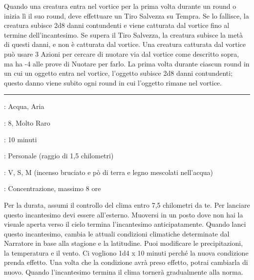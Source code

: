 \begin{multicols}{2}
Quando una creatura entra nel vortice per la prima volta durante un round o inizia lì il suo round, deve effettuare un Tiro Salvezza su Tempra. Se lo fallisce, la creatura subisce 2d8 danni contundenti e viene catturata dal vortice fino al termine dell'incantesimo. Se supera il Tiro Salvezza, la creatura subisce la metà di questi danni, e non è catturata dal vortice. Una creatura catturata dal vortice può usare 3 Azioni per cercare di nuotare via dal vortice come descritto sopra, ma ha -4 alle prove di Nuotare per farlo. La prima volta durante ciascun round in un cui un oggetto entra nel vortice, l'oggetto subisce 2d8 danni contundenti; questo danno viene subito ogni round in cui l'oggetto rimane nel vortice.

\smallskip\noindent\rule{\linewidth}{2pt} \hypertarget{Controllare Tempo Atmosferico}{}\smallskip{}
\noindent
\begin{description}[noitemsep, topsep=0pt, parsep=0pt, partopsep=0pt, leftmargin=0cm, labelwidth=2.8cm]
	\item[\textbf{Lista di Magia}]: Acqua, Aria
	\item[\textbf{Livello}]: 8, Molto Raro
	\item[\textbf{T. di Lancio}]: 10 minuti
	\item[\textbf{Gittata}]: Personale (raggio di 1,5 chilometri)
	\item[\textbf{Componenti}]: V, S, M (incenso bruciato e pò di terra e legno mescolati nell'acqua)
	\item[\textbf{Durata}]: Concentrazione, massimo 8 ore
\end{description}

Per la durata, assumi il controllo del clima entro 7,5 chilometri da te. Per lanciare questo incantesimo devi essere all'esterno. Muoversi in un posto dove non hai la visuale aperta verso il cielo termina l'incantesimo anticipatamente. Quando lanci questo incantesimo, cambia le attuali condizioni climatiche determinate dal Narratore in base alla stagione e la latitudine. Puoi modificare le precipitazioni, la temperatura e il vento. Ci vogliono 1d4 x 10 minuti perché la nuova condizione prenda effetto. Una volta che la condizione avrà preso effetto, potrai cambiarla di nuovo. Quando l'incantesimo termina il clima tornerà gradualmente alla norma.

\medskip


\end{multicols}
